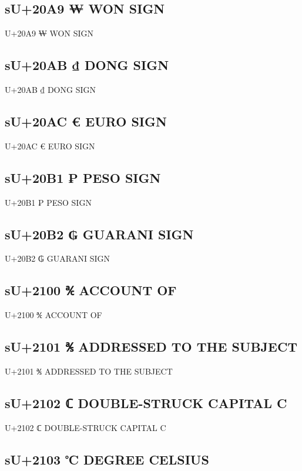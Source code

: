 \subsection{sU+20A9 ₩  WON SIGN}

U+20A9 ₩  WON SIGN

\subsection{sU+20AB ₫  DONG SIGN}

U+20AB ₫  DONG SIGN

\subsection{sU+20AC €  EURO SIGN}

U+20AC €  EURO SIGN

\subsection{sU+20B1 ₱  PESO SIGN}

U+20B1 ₱  PESO SIGN

\subsection{sU+20B2 ₲ GUARANI SIGN}

U+20B2 ₲ GUARANI SIGN

\subsection{sU+2100 ℀  ACCOUNT OF}

U+2100 ℀  ACCOUNT OF

\subsection{sU+2101 ℁  ADDRESSED TO THE SUBJECT}

U+2101 ℁  ADDRESSED TO THE SUBJECT

\subsection{sU+2102 ℂ DOUBLE-STRUCK CAPITAL C}

U+2102 ℂ DOUBLE-STRUCK CAPITAL C

\subsection{sU+2103 ℃  DEGREE CELSIUS}

